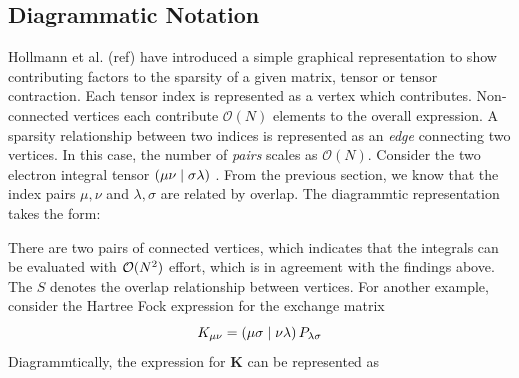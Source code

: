 
\subsection{Diagrammatic Notation}

Hollmann et al. (ref) have introduced a simple graphical representation to show contributing factors to the sparsity of a given matrix, tensor or tensor contraction. Each tensor index is represented as a vertex which contributes. Non-connected vertices each contribute $\mathcal{O}(N)$ elements to the overall expression. A sparsity relationship between two indices is represented as an \emph{edge} connecting two vertices. In this case, the number of \emph{pairs} scales as $\mathcal{O}(N)$. Consider the two electron integral tensor $\left( \mu\nu \mid \sigma\lambda \right)$ . From the previous section, we know that the index pairs $\mu,\nu$ and $\lambda,\sigma$ are related by overlap. The diagrammtic representation takes the form:
\begin{center}
\end{center}
\noindent There are two pairs of connected vertices, which indicates that the integrals can be evaluated with $\mathcal{O}(N^{2})$ effort, which is in agreement with the findings above. The $S$ denotes the overlap relationship between vertices.
For another example, consider the Hartree Fock expression for the exchange matrix
\begin{equation}
K_{\mu\nu} = \left( \mu\sigma \mid \nu\lambda \right) P_{\lambda\sigma}
\end{equation}
\noindent Diagrammtically, the expression for $\mathbf{K}$ can be represented as
\begin{center}
\end{center}

